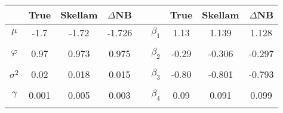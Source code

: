 \begin{tabular}{cccc c cccc} \toprule 
& True &  \multicolumn{1}{c}{Skellam}&  \multicolumn{1}{c}{$\Delta$NB} & &
& True &  \multicolumn{1}{c}{Skellam}&  \multicolumn{1}{c}{$\Delta$NB} \\ \midrule 
 $ \mu $ & -1.7 & -1.72 & -1.726 & & $ \beta_{1} $ & 1.13 & 1.139 & 1.128 \\ 
 & &\begin{scriptsize} [-1.797,-1.642] \end{scriptsize}  & \begin{scriptsize} [-1.804,-1.651] \end{scriptsize}  & &  & &\begin{scriptsize} [0.884,1.392] \end{scriptsize}  & \begin{scriptsize} [0.875,1.38] \end{scriptsize}  \\ 
$ \varphi $ & 0.97 & 0.973 & 0.975 & &  $ \beta_{2} $ & -0.29 & -0.306 & -0.297 \\ 
 & & \begin{scriptsize} [0.965,0.979] \end{scriptsize}  & \begin{scriptsize} [0.969,0.981] \end{scriptsize}  & &  & &\begin{scriptsize} [-0.453,-0.158] \end{scriptsize}  & \begin{scriptsize} [-0.448,-0.151] \end{scriptsize}  \\ 
$ \sigma^{2} $ & 0.02 & 0.018 & 0.015 & & $ \beta_{3} $ & -0.80 & -0.801 & -0.793 \\  
 & &\begin{scriptsize} [0.013,0.023] \end{scriptsize}  & \begin{scriptsize} [0.011,0.02] \end{scriptsize}  & &  & &\begin{scriptsize} [-0.943,-0.657] \end{scriptsize}  & \begin{scriptsize} [-0.933,-0.65] \end{scriptsize}  \\ 
$\gamma$ & 0.001 & 0.005 & 0.003 & & $ \beta_{4} $ & 0.09 & 0.091 & 0.099 \\ 
 & &\begin{scriptsize} [0,0.017] \end{scriptsize}  & \begin{scriptsize} [0,0.01] \end{scriptsize}  & &  & &\begin{scriptsize} [-0.052,0.23] \end{scriptsize}  & \begin{scriptsize} [-0.04,0.24] \end{scriptsize}  \\  

\end{tabular}
